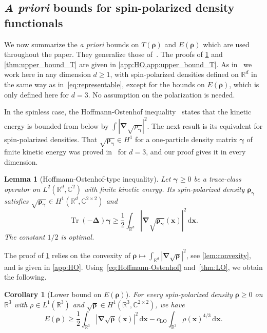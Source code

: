 \documentclass[final,reqno]{amsart}
\newtheorem{lemma}[theorem]{Lemma}
\newtheorem{corollary}[theorem]{Corollary}
\theoremstyle{remark}
\renewcommand{\ge}{\geqslant}
\DeclareMathOperator{\Tr}{Tr}
\newcommand{\RR}{\mathbb{R}}
\newcommand{\CC}{\mathbb{C}}
\newcommand{\LO}{\mathrm{LO}}
\newcommand{\lapl}{\bm{\Delta}}
\newcommand{\grad}{\bm{\nabla}}
\newcommand{\dd}{\mathrm{d}}
\begin{document}
\subsection{\emph{A priori} bounds for spin-polarized density functionals}\label{sec:a_priori}
We now summarize the \emph{a priori} bounds on $T(\bm{\rho})$ and $E(\bm{\rho})$ which are used throughout the paper. They generalize those of~\cite[Section 3]{lewin2020local}. The proofs of \cref{lem:HO} and \cref{thm:upper_bound_T} are given in \cref{app:HO,app:upper_bound_T}. As in~\cite{lewin2020local} we work here in any dimension $d\ge1$, with spin-polarized densities defined on $\RR^d$ in the same way as in~\cref{eq:representable}, except for the bounds on $E(\bm{\rho})$, which is only defined here for $d=3$. No assumption on the polarization is needed.

In the spinless case, the Hoffmann-Ostenhof inequality~\cite{hoffmann1977schrodinger} states that the kinetic energy is bounded from below by $\int|\grad\sqrt{\rho_{\bm{\gamma}}}|^2$. The next result is its equivalent for spin-polarized densities. That $\sqrt{\bm{\rho}_{\bm{\gamma}}}\in H^1$ for a one-particle density matrix $\bm{\gamma}$ of finite kinetic energy was proved in~\cite{gontier2013n} for $d=3$, and our proof gives it in every dimension.

\begin{lemma}[Hoffmann-Ostenhof-type inequality]\label{lem:HO}
Let $\bm{\gamma}\ge0$ be a trace-class operator on $L^2(\RR^d,\CC^2)$ with finite kinetic energy. Its spin-polarized density $\bm{\rho}_{\bm{\gamma}}$ satisfies $\sqrt{\bm{\rho}_{\bm{\gamma}}}\in H^1(\RR^d,\CC^{2\times2})$ and
\begin{equation}\label{eq:Hoffmann-Ostenhof}
\Tr(-\lapl)\bm{\gamma}\ge \frac12\int_{\RR^d} \left|\grad\sqrt{\bm{\rho}_{\bm{\gamma}}}(\mathbf{x})\right|^2\,\dd \mathbf{x}.
\end{equation}
The constant $1/2$ is optimal.
\end{lemma}

The proof of \cref{lem:HO} relies on the convexity of $\bm{\rho}\mapsto\int_{\RR^d}|\grad\sqrt{\bm{\rho}}|^2$, see \cref{lem:convexity}, and is given in \cref{app:HO}. Using~\cref{eq:Hoffmann-Ostenhof} and~\cref{thm:LO}, we obtain the following.

\begin{corollary}[Lower bound on $E(\bm{\rho})$]\label{cor:lower_bound_E_rho}
For every spin-polarized density $\bm{\rho}\ge0$ on $\RR^3$ with $\rho\in L^1(\RR^3)$ and $\sqrt{\bm{\rho}}\in H^1(\RR^3,\CC^{2\times2})$, we have
\begin{equation*}
E(\bm{\rho})\ge \frac12\int_{\RR^3}|\grad\sqrt{\bm{\rho}}(\mathbf{x})|^2\,\dd \mathbf{x}-c_\LO\int_{\RR^3}\rho(\mathbf{x})^{4/3}\,\dd \mathbf{x}.
\end{equation*}
\end{corollary}
\end{document}
